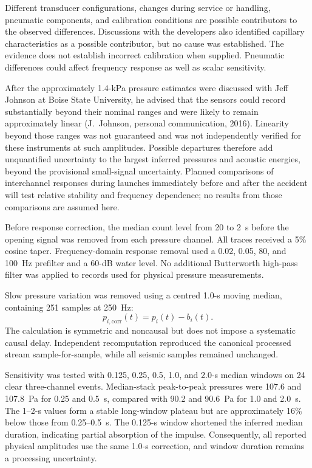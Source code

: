 \documentclass[]{seismica}
\begin{document}
Different transducer configurations, changes during service or handling,
pneumatic components, and calibration conditions are possible contributors
to the observed differences. Discussions with the developers also identified
capillary characteristics as a possible contributor, but no cause was
established. The evidence does not establish incorrect calibration when
supplied. Pneumatic differences could affect frequency response as well as
scalar sensitivity.

After the approximately 1.4-kPa pressure estimates were discussed with Jeff
Johnson at Boise State University, he advised that the sensors could record
substantially beyond their nominal ranges and were likely to remain
approximately linear (J.~Johnson, personal communication, 2016). Linearity
beyond those ranges was not guaranteed and was not independently verified
for these instruments at such amplitudes. Possible departures therefore add
unquantified uncertainty to the largest inferred pressures and acoustic
energies, beyond the provisional small-signal uncertainty. Planned comparisons
of interchannel responses during launches immediately before and after the
accident will test relative stability and frequency dependence; no results
from those comparisons are assumed here.

Before response correction, the median count level from 20 to 2~s before the
opening signal was removed from each pressure channel. All traces received a
5\% cosine taper. Frequency-domain response removal used a 0.02, 0.05, 80, and
100~Hz prefilter and a 60-dB water level. No additional Butterworth high-pass
filter was applied to records used for physical pressure measurements.

Slow pressure variation was removed using a centred 1.0-s moving median,
containing 251 samples at 250~Hz:
\begin{equation}
 p_{i,\mathrm{corr}}(t)=p_i(t)-b_i(t).
\end{equation}
The calculation is symmetric and noncausal but does not impose a systematic
causal delay. Independent recomputation reproduced the canonical processed
stream sample-for-sample, while all seismic samples remained unchanged.

Sensitivity was tested with 0.125, 0.25, 0.5, 1.0, and 2.0-s median windows on
24 clear three-channel events. Median-stack peak-to-peak pressures were 107.6
and 107.8~Pa for 0.25 and 0.5~s, compared with 90.2 and 90.6~Pa for 1.0 and
2.0~s. The 1--2-s values form a stable long-window plateau but are
approximately 16\% below those from 0.25--0.5~s. The 0.125-s window shortened
the inferred median duration, indicating partial absorption of the impulse.
Consequently, all reported physical amplitudes use the same 1.0-s correction,
and window duration remains a processing uncertainty.
\end{document}
